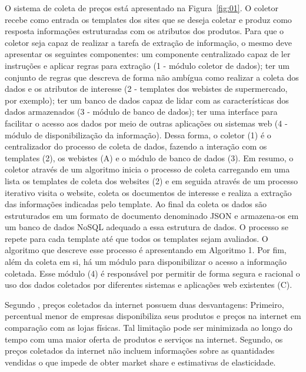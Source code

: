\documentclass[twoside,a4paper,11pt]{report}
\begin{document}
O sistema de coleta de preços está apresentado na Figura~\ref{fig:01}. O coletor recebe como entrada os templates dos sites que se deseja coletar e produz como resposta informações estruturadas com os atributos dos produtos. Para que o coletor seja capaz de realizar a tarefa de extração de informação, o mesmo deve apresentar os seguintes componentes: um componente centralizado capaz de ler instruções e aplicar regras para extração (1 - módulo coletor de dados); ter um conjunto de regras que descreva de forma não ambígua como realizar a coleta dos dados e os atributos de interesse (2 - templates dos webistes de supermercado, por exemplo); ter um banco de dados capaz de lidar com as características dos dados armazenados (3 - módulo de banco de dados); ter uma interface para facilitar o acesso aos dados por meio de outras aplicações ou sistemas web (4 - módulo de disponibilização da informação). Dessa forma, o coletor (1) é o centralizador do processo de coleta de dados, fazendo a interação com os templates (2), os webistes (A) e o módulo de banco de dados (3). Em resumo, o coletor através de um algoritmo inicia o processo de coleta carregando em uma lista os templates de coleta dos websites (2) e em seguida através de um processo iterativo visita o website, coleta os documentos de interesse e realiza a extração das informações indicadas pelo template. Ao final da coleta os dados são estruturados em um formato de documento denominado JSON e armazena-os em um banco de dados NoSQL adequado a essa estrutura de dados. O processo se repete para cada template até que todos os templates sejam avaliados. O algoritmo que descreve esse processo é apresentando em Algoritmo 1. Por fim, além da coleta em si, há um módulo para disponibilizar o acesso a informação coletada. Esse módulo (4) é responsável por permitir de forma segura e racional o uso dos dados coletados por diferentes sistemas e aplicações web existentes (C).

Segundo \citet{cavallo2010scraped}, preços coletados da internet possuem duas desvantagens: Primeiro, percentual menor de empresas disponibiliza seus produtos e preços na internet em comparação com as lojas físicas. Tal limitação pode ser minimizada ao longo do tempo com uma maior oferta de produtos e serviços na internet. Segundo, os preços coletados da internet não incluem informações sobre as quantidades vendidas o que impede de obter market share e estimativas de elasticidade.
\end{document}
